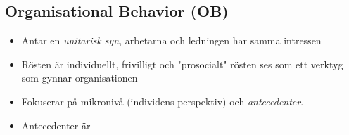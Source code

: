 \documentclass[12pt]{article}
\begin{document}
\subsection{Organisational Behavior (OB)}
\begin{itemize}
    \item Antar en \textit{unitarisk syn}, arbetarna och ledningen har samma intressen
    \item Rösten är individuellt, frivilligt och "prosocialt" rösten ses som ett verktyg som gynnar organisationen 
    \item Fokuserar på mikronivå (individens perspektiv) och \textit{antecedenter}.
    \item Antecedenter är 
\end{itemize}
\end{document}
